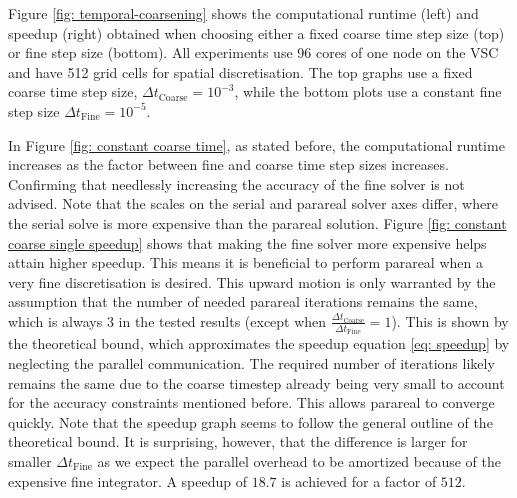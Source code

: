 Figure \ref{fig: temporal-coarsening} shows the computational runtime (left) and speedup (right) obtained when choosing either a fixed coarse time step size (top) or fine step size (bottom). All experiments use 96 cores of one node on the VSC and have 512 grid cells for spatial discretisation. The top graphs use a fixed coarse time step size, $\Delta t_\mathrm{Coarse} = 10^{-3}$, while the bottom plots use a constant fine step size $\Delta t_\mathrm{Fine} = 10^{-5}$. 

In Figure \ref{fig: constant coarse time}, as stated before, the computational runtime increases as the factor between fine and coarse time step sizes increases. Confirming that needlessly increasing the accuracy of the fine solver is not advised. Note that the scales on the serial and parareal solver axes differ, where the serial solve is more expensive than the parareal solution. 
Figure \ref{fig: constant coarse single speedup} shows that making the fine solver more expensive helps attain higher speedup. This means it is beneficial to perform parareal when a very fine discretisation is desired. This upward motion is only warranted by the assumption that the number of needed parareal iterations remains the same, which is always $3$ in the tested results (except when $\frac{\Delta t_\mathrm{Coarse}}{\Delta t_\mathrm{Fine}}=1$). This is shown by the theoretical bound, which approximates the speedup equation \ref{eq: speedup} by neglecting the parallel communication. The required number of iterations likely remains the same due to the coarse timestep already being very small to account for the accuracy constraints mentioned before. This allows parareal to converge quickly. Note that the speedup graph seems to follow the general outline of the theoretical bound. It is surprising, however, that the difference is larger for smaller $\Delta t_\mathrm{Fine}$ as we expect the parallel overhead to be amortized because of the expensive fine integrator. A speedup of $18.7$ is achieved for a factor of $512$.


